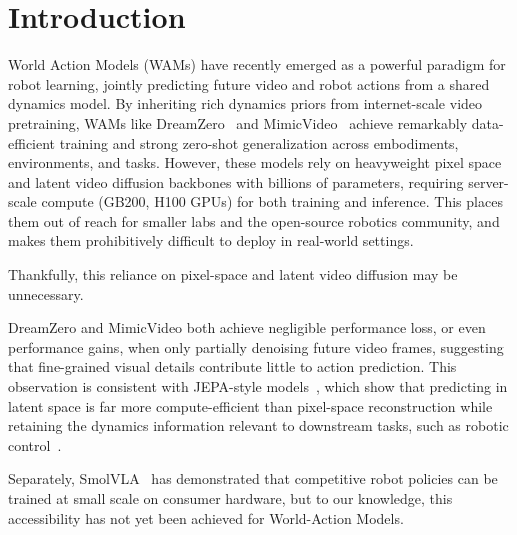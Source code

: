 \section{Introduction}

World Action Models (WAMs) have recently emerged as a powerful paradigm for robot learning, jointly predicting future video and robot actions from a shared dynamics model.
By inheriting rich dynamics priors from internet-scale video pretraining, WAMs like DreamZero~\cite{DreamZero} and MimicVideo~\cite{MimicVideo} achieve remarkably data-efficient training and strong zero-shot generalization across embodiments, environments, and tasks.
However, these models rely on heavyweight pixel space and latent video diffusion backbones with billions of parameters, requiring server-scale compute (GB200, H100 GPUs) for both training and inference. This places them out of reach for smaller labs and the open-source robotics community, and makes them prohibitively difficult to deploy in real-world settings.

Thankfully, this reliance on pixel-space and latent video diffusion may be unnecessary.

DreamZero and MimicVideo both achieve negligible performance loss, or even performance gains, when only partially denoising future video frames, suggesting that fine-grained visual details contribute little to action prediction.
This observation is consistent with JEPA-style models~\cite{vjepa2_1, LeWorldModel, IJEPA}, which show that predicting in latent space is far more compute-efficient than pixel-space reconstruction while retaining the dynamics information relevant to downstream tasks, such as robotic control~\cite{LeWorldModel, vjepa2_1}.


Separately, SmolVLA~\cite{SmolVLA} has demonstrated that competitive robot policies can be trained at small scale on consumer hardware, but to our knowledge, this accessibility has not yet been achieved for World-Action Models. 


